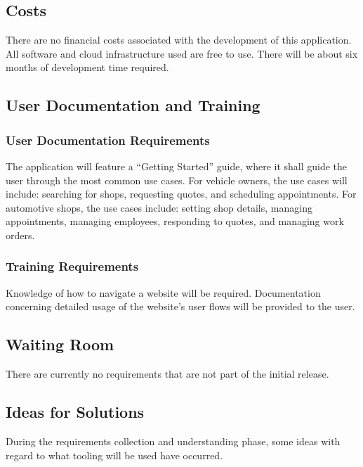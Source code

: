 \documentclass[12pt]{article}
\begin{document}
\subsection{Costs}

There are no financial costs associated with the development of this application. All software and
cloud infrastructure used are free to use. There will be about six months of development time
required.

\subsection{User Documentation and Training}
\subsubsection{User Documentation Requirements}

The application will feature a ``Getting Started'' guide, where it shall guide the user through the
most common use cases. For vehicle owners, the use cases will include: searching for shops,
requesting quotes, and scheduling appointments. For automotive shops, the use cases include:
setting shop details, managing appointments, managing employees, responding to quotes, and managing
work orders.

\subsubsection{Training Requirements}

Knowledge of how to navigate a website will be required. Documentation concerning detailed usage of
the website's user flows will be provided to the user.

\subsection{Waiting Room}

There are currently no requirements that are not part of the initial release.

\subsection{Ideas for Solutions}

During the requirements collection and understanding phase, some ideas with regard to what tooling
will be used have occurred.
\end{document}

